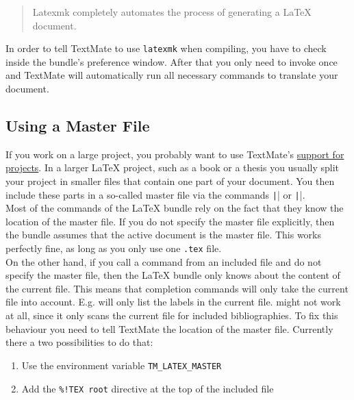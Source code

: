 \documentclass[11pt, x11names]{article}
\begin{document}
\begin{quote}
  Latexmk completely automates the process of generating a LaTeX document.
\end{quote}

\begin{sloppypar}
In order to tell TextMate to use \texttt{latexmk} when compiling, you have to check  inside the bundle's preference window. After that you only need to invoke  once and TextMate will automatically run all necessary commands to translate your document.
\end{sloppypar}

\subsection{Using a Master File}

If you work on a large project, you probably want to use TextMate's \href{http://manual.textmate.org/projects}{support for projects}. In a larger LaTeX project, such as a book or a thesis you usually split your project in smaller files that contain one part of your document. You then include these parts in a so-called master file via the commands \texttt|| or \texttt||.\\

Most of the commands of the LaTeX bundle rely on the fact that they know the location of the master file. If you do not specify the master file explicitly, then the bundle assumes that the active document is the master file. This works perfectly fine, as long as you only use one \texttt{.tex} file.\\

On the other hand, if you call a command from an included file and do not specify the master file, then the LaTeX bundle only knows about the content of the current file. This means that completion commands will only take the current file into account. E.g.  will only list the labels in the current file.  might not work at all, since it only scans the current file for included bibliographies. To fix this behaviour you need to tell TextMate the location of the master file. Currently there a two possibilities to do that:

\begin{enumerate}
  \item Use the environment variable \texttt{TM\_LATEX\_MASTER}
  \item Add the \texttt{\%!TEX\ root} directive at the top of the included file
\end{enumerate}
\end{document}
